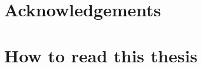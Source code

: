 \frontmatterCS
 



\chapter*{Acknowledgements} 


\cleardoublepage
{} 



\begingroup
\clearpage
\tableofcontents
\endgroup


\chapter{How to read this thesis}


